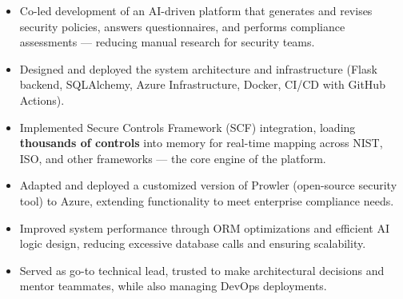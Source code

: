\documentclass[10pt,a4paper,ragged2e,withhyper]{altacv}
\begin{document}
\begin{paracol}{2}
            \begin{itemize}
                \item Co-led development of an AI-driven platform that generates and revises security policies, answers questionnaires, and performs compliance assessments — reducing manual research for security teams.
                \item Designed and deployed the system architecture and infrastructure (Flask backend, SQLAlchemy, Azure Infrastructure, Docker, CI/CD with GitHub Actions).
                \item Implemented Secure Controls Framework (SCF) integration, loading \textbf{thousands of controls} into memory for real-time mapping across NIST, ISO, and other frameworks — the core engine of the platform.
                \item Adapted and deployed a customized version of Prowler (open-source security tool) to Azure, extending functionality to meet enterprise compliance needs.
                \item Improved system performance through ORM optimizations and efficient AI logic design, reducing excessive database calls and ensuring scalability.
                \item Served as go-to technical lead, trusted to make architectural decisions and mentor teammates, while also managing DevOps deployments.
            \end{itemize}

            \divider


\end{paracol}
\end{document}
